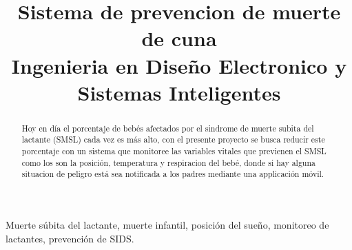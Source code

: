 \title{
    Sistema de prevencion de muerte de cuna\\
    \small{Ingenieria en Diseño Electronico y Sistemas Inteligentes}
}
\author{
    \and
    \and
}
\maketitle

%
%
\begin{abstract}

    Hoy en día el porcentaje de bebés afectados por el sindrome de muerte subita del lactante (SMSL) cada vez es más alto,
    con el presente proyecto se busca reducir este porcentaje con un sistema que monitoree las variables vitales que previenen el SMSL como los son la posición, temperatura y respiracion del bebé,
    donde si hay alguna situacion de peligro está sea notificada a los padres mediante una applicación móvil.


\end{abstract}
\begin{IEEEkeywords}
    Muerte súbita del lactante, muerte infantil, posición del sueño, monitoreo de lactantes, prevención de SIDS.
\end{IEEEkeywords}

\tableofcontents
